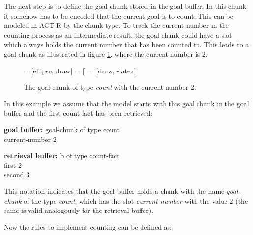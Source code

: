 The next step is to define the goal chunk stored in the goal buffer. In this chunk it somehow has to be encoded that the current goal is to count. This can be modeled in ACT-R by the chunk-type. To track the current number in the counting process as an intermediate result, the goal chunk could have a slot which always holds the current number that has been counted to. This leads to a goal chunk as illustrated in figure \ref{fig:example_counting_goal_chunk}, where the current number is $2$.

\begin{figure}[hbt]
\centering
{} = [ellipse, draw]
 = [] 
 = [draw, -latex]   

\caption{The goal-chunk of type \emph{count} with the current number 2.}
\label{fig:example_counting_goal_chunk}
\end{figure}


In this example we assume that the model starts with this goal chunk in the goal buffer and the first count fact has been retrieved:

\parbox{100mm}{\textbf{goal buffer:} goal-chunk of type count\\
\noindent\hspace*{20mm} current-number $2$}

\parbox{100mm}{\textbf{retrieval buffer:} b of type count-fact\\
\noindent\hspace*{20mm} first $2$\\
\noindent\hspace*{20mm} second $3$}

This notation indicates that the goal buffer holds a chunk with the name \emph{goal-chunk} of the type \emph{count}, which has the slot \emph{current-number} with the value $2$ (the same is valid analogously for the retrieval buffer).

Now the rules to implement counting can be defined as:

\begin{center}
\end{center}


